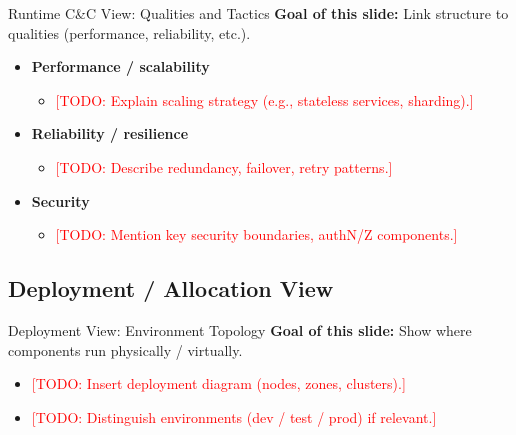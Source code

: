 \documentclass[aspectratio=169]{beamer}
\newcommand{\TODO}[1]{\textcolor{red}{[TODO: #1]}}
\begin{document}
\begin{frame}{Runtime C\&C View: Qualities and Tactics}
  \textbf{Goal of this slide:} Link structure to qualities (performance, reliability, etc.).

  \begin{itemize}
    \item \textbf{Performance / scalability}
      \begin{itemize}
        \item \TODO{Explain scaling strategy (e.g., stateless services, sharding).}
      \end{itemize}
    \item \textbf{Reliability / resilience}
      \begin{itemize}
        \item \TODO{Describe redundancy, failover, retry patterns.}
      \end{itemize}
    \item \textbf{Security}
      \begin{itemize}
        \item \TODO{Mention key security boundaries, authN/Z components.}
      \end{itemize}
  \end{itemize}
\end{frame}

\subsection*{Deployment / Allocation View}

\begin{frame}{Deployment View: Environment Topology}
  \textbf{Goal of this slide:} Show where components run physically / virtually.

  \begin{itemize}
    \item \TODO{Insert deployment diagram (nodes, zones, clusters).}
    \item \TODO{Distinguish environments (dev / test / prod) if relevant.}
  \end{itemize}
\end{frame}
\end{document}
